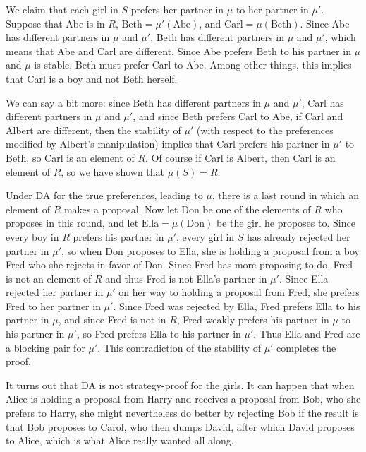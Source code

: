 \documentclass[12pt]{article}
\theoremstyle{definition}
\begin{document}
We claim that each girl in $S$ prefers her partner in $\mu$ to her
partner in $\mu'$.  Suppose that Abe is in $R$, $\mathrm{Beth} =
\mu'(\mathrm{Abe})$, and $\textrm{Carl} = \mu(\textrm{Beth})$. Since
Abe has different partners in $\mu$ and $\mu'$, Beth has different
partners in $\mu$ and $\mu'$, which means that Abe and Carl are
different.  Since Abe prefers Beth to his partner in $\mu$ and $\mu$
is stable, Beth must prefer Carl to Abe.  Among other things, this
implies that Carl is a boy and not Beth herself.

We can say a bit more: since Beth has different partners in $\mu$ and
$\mu'$, Carl has different partners in $\mu$ and $\mu'$, and since
Beth prefers Carl to Abe, if Carl and Albert are different, then the
stability of $\mu'$ (with respect to the preferences modified by
Albert's manipulation) implies that Carl prefers his partner in $\mu'$
to Beth, so Carl is an element of $R$.  Of course if Carl is Albert,
then Carl is an element of $R$, so we have shown that $\mu(S) = R$.

Under DA for the true preferences, leading to $\mu$, there is a last
round in which an element of $R$ makes a proposal.  Now let Don be one
of the elements of $R$ who proposes in this round, and let
$\textrm{Ella} = \mu(\textrm{Don})$ be the girl he proposes to.  Since
every boy in $R$ prefers his partner in $\mu'$, every girl in $S$ has
already rejected her partner in $\mu'$, so when Don proposes to Ella,
she is holding a proposal from a boy Fred who she rejects in favor of
Don.  Since Fred has more proposing to do, Fred is not an element of
$R$ and thus Fred is not Ella's partner in $\mu'$.  Since Ella
rejected her partner in $\mu'$ on her way to holding a proposal from
Fred, she prefers Fred to her partner in $\mu'$.  Since Fred was
rejected by Ella, Fred prefers Ella to his partner in $\mu$, and since
Fred is not in $R$, Fred weakly prefers his partner in $\mu$ to his
partner in $\mu'$, so Fred prefers Ella to his partner in $\mu'$.
Thus Ella and Fred are a blocking pair for $\mu'$.  This contradiction
of the stability of $\mu'$ completes the proof.

It turns out that DA is not strategy-proof for the girls.  It can
happen that when Alice is holding a proposal from Harry and receives a
proposal from Bob, who she prefers to Harry, she might nevertheless do
better by rejecting Bob if the result is that Bob proposes to Carol,
who then dumps David, after which David proposes to Alice, which is
what Alice really wanted all along.
\end{document}
